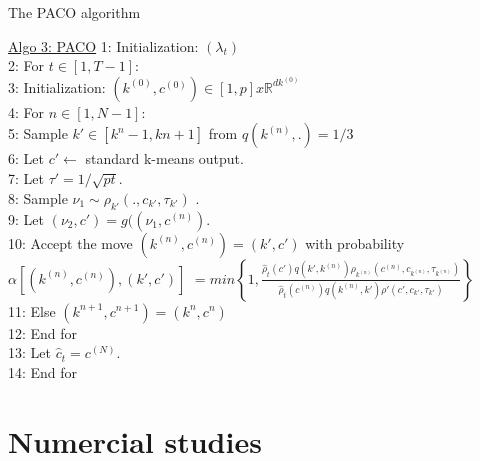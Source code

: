 \documentclass[10pt]{beamer}
\begin{document}
\begin{frame}{The PACO algorithm}
\begin{block}{\underline{Algo 3: PACO}}
1: Initialization: $(\lambda_{t})$\\
2: For $t \in [1, T-1]:$\\
3: Initialization: $(k^{(0)}, c^{(0)}) \in [1,p] x \mathds{R}^{dk^{(0)}} $\\
4: For $n \in [1, N-1]:$\\
5: \quad Sample $k' \in [k^{n}-1, k{n}+1]$ from $q(k^{(n)}, .)=1/3$\\
6: \quad Let $c' \leftarrow$ standard k-means output.\\
7: \quad Let $\tau' =  1/ \sqrt{pt}$.\\
8: \quad Sample $\nu_{1} \sim \rho_{k'}(.,c_{k'}, \tau_{k'})$ .\\
9: \quad Let $(\nu_{2}, c') = g((\nu_{1}, c^{(n)})$.\\
10: \quad Accept the move $(k^{(n)}, c^{(n)}) = (k',c')$ with probability\\
$\alpha \left[  (k^{(n)}, c^{(n)}) , (k',c') \right]$
$= min \left\{ 1, \frac{\hat{\rho}_{t}(c')q(k', k^{(n)})\rho_{k^{(n)}}(c^{(n)}, c_{k^{(n)}}, \tau_{k^{(n)}})}{\hat{\rho}_{t}(c^{(n)})q(k^{(n)},k') \rho'(c', c_{k'}, \tau_{k'})}   \right\}  $\\
11: \quad Else $(k^{n+1}, c^{n+1}) = (k^{n}, c^{n})$\\
12: End for\\
13: Let $\hat{c}_{t} = c^{(N)}$.\\
14: End for
\end{block}
\end{frame}



\section{Numercial studies}
\end{document}

